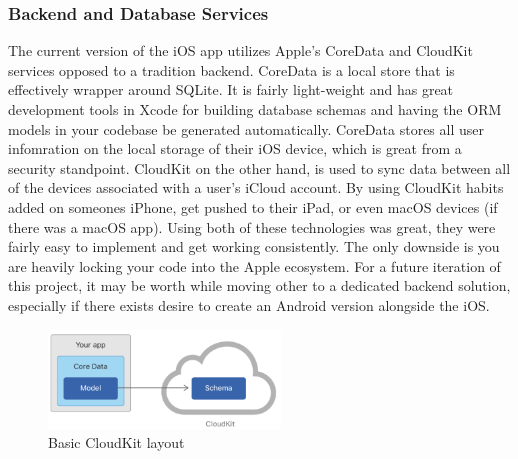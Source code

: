 \subsubsection{Backend and Database Services}
The current version of the iOS app utilizes Apple's CoreData and CloudKit services opposed to a tradition backend. CoreData is a local store that is effectively wrapper around SQLite. It is fairly light-weight and has great development tools in Xcode for building database schemas and having the ORM models in your codebase be generated automatically. CoreData stores all user infomration on the local storage of their iOS device, which is great from a security standpoint. CloudKit on the other hand, is used to sync data between all of the devices associated with a user's iCloud account. By using CloudKit habits added on someones iPhone, get pushed to their iPad, or even macOS devices (if there was a macOS app). Using both of these technologies was great, they were fairly easy to implement and get working consistently. The only downside is you are heavily locking your code into the Apple ecosystem. For a future iteration of this project, it may be worth while moving other to a dedicated backend solution, especially if there exists desire to create an Android version alongside the iOS.
\begin{figure}[h]
\centering
\includegraphics[width=0.55\textwidth]{images/cloudkit.png}
\caption{Basic CloudKit layout}
\end{figure}
